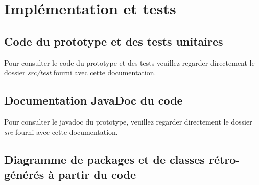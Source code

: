 \documentclass[10pt,a4paper]{book}
\begin{document}
\chapter{Implémentation et tests}
\section{Code du prototype et des tests unitaires}
Pour consulter le code du prototype et des tests veuillez regarder directement le dossier \textit{src/test} fourni avec cette documentation.
\section{Documentation JavaDoc du code}
Pour consulter le javadoc du prototype, veuillez regarder directement le dossier \textit{src} fourni avec cette documentation.
\section{Diagramme de packages et de classes rétro-générés à partir du code}
\end{document}
